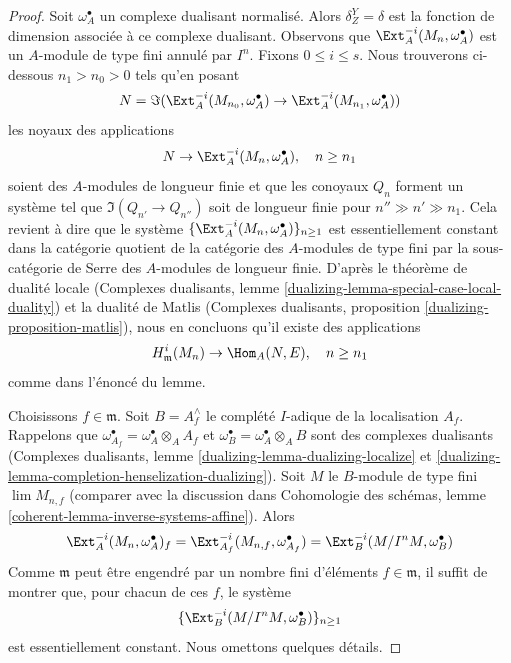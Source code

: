 \begin{proof}
Soit $\omega_A^\bullet$ un complexe dualisant normalisé. Alors
$\delta^Y_Z = \delta$ est la fonction de dimension associée à
ce complexe dualisant.
Observons que $\Ext^{-i}_A(M_n, \omega_A^\bullet)$ est un $A$-module de type fini
annulé par $I^n$. Fixons $0 \leq i \leq s$.
Nous trouverons ci-dessous $n_1 > n_0 > 0$ tels qu'en posant
$$
N = \Im(\Ext^{-i}_A(M_{n_0}, \omega_A^\bullet) \to
\Ext^{-i}_A(M_{n_1}, \omega_A^\bullet))
$$
les noyaux des applications
$$
N \to \Ext^{-i}_A(M_n, \omega_A^\bullet),\quad n \geq n_1
$$
soient des $A$-modules de longueur finie et que les conoyaux $Q_n$ forment un
système tel que $\Im(Q_{n'} \to Q_{n''})$ soit de longueur finie
pour $n'' \gg n' \gg n_1$. Cela revient à dire que
le système $\{\Ext^{-i}_A(M_n, \omega_A^\bullet)\}_{n \geq 1}$
est essentiellement constant dans la catégorie quotient de la catégorie des
$A$-modules de type fini par la sous-catégorie de Serre des $A$-modules de longueur finie.
D'après le théorème de dualité locale
(Complexes dualisants, lemme \ref{dualizing-lemma-special-case-local-duality})
et la dualité de Matlis
(Complexes dualisants, proposition \ref{dualizing-proposition-matlis}),
nous en concluons qu'il existe des applications
$$
H^i_\mathfrak m(M_n) \to \Hom_A(N, E),\quad n \geq n_1
$$
comme dans l'énoncé du lemme.

\medskip\noindent
Choisissons $f \in \mathfrak m$. Soit $B = A_f^\wedge$ le complété $I$-adique
de la localisation $A_f$. Rappelons que
$\omega_{A_f}^\bullet = \omega_A^\bullet \otimes_A A_f$
et $\omega_B^\bullet = \omega_A^\bullet \otimes_A B$ sont des complexes
dualisants (Complexes dualisants, lemme \ref{dualizing-lemma-dualizing-localize}
et \ref{dualizing-lemma-completion-henselization-dualizing}).
Soit $M$ le $B$-module de type fini $\lim M_{n, f}$ (comparer avec la
discussion dans Cohomologie des schémas, lemme
\ref{coherent-lemma-inverse-systems-affine}). Alors
$$
\Ext^{-i}_A(M_n, \omega_A^\bullet)_f =
\Ext^{-i}_{A_f}(M_{n, f}, \omega_{A_f}^\bullet) =
\Ext^{-i}_B(M/I^n M, \omega_B^\bullet)
$$
Comme $\mathfrak m$ peut être engendré par un nombre fini d'éléments $f \in \mathfrak m$,
il suffit de montrer que, pour chacun de ces $f$, le système
$$
\{\Ext^{-i}_B(M/I^n M, \omega_B^\bullet)\}_{n \geq 1}
$$
est essentiellement constant. Nous omettons quelques détails.


\end{proof}

